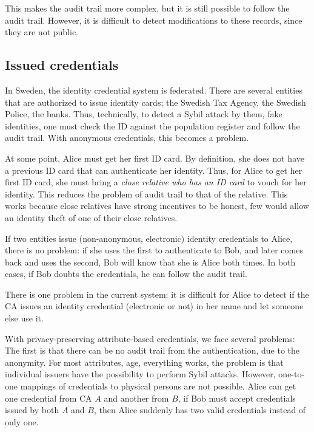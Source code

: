 This makes the audit trail more complex, but it is still possible to follow the 
audit trail.
However, it is difficult to detect modifications to these records, since they 
are not public.

%


\subsection{Issued credentials}

In Sweden, the identity credential system is federated.
There are several entities that are authorized to issue identity cards; \eg the 
Swedish Tax Agency, the Swedish Police, the banks.
Thus, technically, to detect a Sybil attack by them, \ie fake identities, one 
must check the ID against the population register and follow the audit trail.
With anonymous credentials, this becomes a problem.

At some point, Alice must get her first ID card.
By definition, she does not have a previous ID card that can authenticate her 
identity.
Thus, for Alice to get her first ID card, she must bring a \emph{close relative 
  who has an ID card} to vouch for her identity.
This reduces the problem of audit trail to that of the relative.
This works because close relatives have strong incentives to be honest, few 
would allow an identity theft of one of their close relatives.

If two entities issue (non-anonymous, electronic) identity credentials to 
Alice, there is no problem: if she uses the first to authenticate to Bob, and 
later comes back and uses the second, Bob will know that she is Alice both 
times.
In both cases, if Bob doubts the credentials, he can follow the audit trail.

There is one problem in the current system: it is difficult for Alice to detect 
if the \ac{CA} issues an identity credential (electronic or not) in her name 
and let someone else use it.

With privacy-preserving attribute-based credentials, we face several problems:
The first is that there can be no audit trail from the authentication, due to 
the anonymity.
For most attributes, \eg age, everything works, the problem is that individual 
issuers have the possibility to perform Sybil attacks.
However, one-to-one mappings of credentials to physical persons are not 
possible.
Alice can get one credential from \ac{CA} \(A\) and another from \(B\), if Bob 
must accept credentials issued by both \(A\) and \(B\), then Alice suddenly has 
two valid credentials instead of only one.


